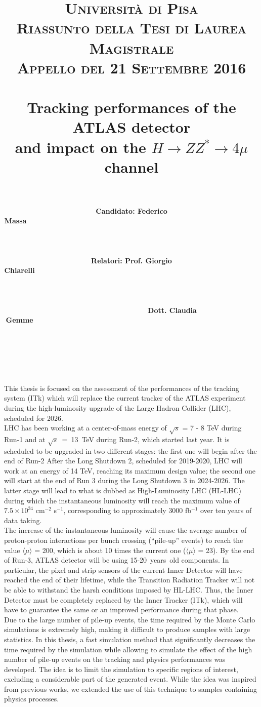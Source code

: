 \documentclass[paper=a4, fontsize=11pt]{scrartcl}	%
\title{
		\usefont{OT1}{bch}{b}{n}
		\normalfont \normalsize \textsc{Universit\`a di Pisa} \\[1ex]
		\normalfont \normalsize \textsc{Riassunto della Tesi di Laurea Magistrale}\\ 
		\normalfont \normalsize \textsc{Appello del 21 Settembre 2016}\\ [25pt]
		\horrule{0.5pt} \\[0.4cm]
		\huge  Tracking performances of the ATLAS detector \\
			and impact on the $H\rightarrow ZZ^{*}\rightarrow 4\mu$ channel\\
		\horrule{2pt} \\[0.0cm]
}
\author{
		\normalfont 								\normalsize
        \textbf{Candidato: Federico Massa\ \ \ \ \ \ \ \ \ \ \ \ \ \ \ \ \ \ \ \ \ \ \ \ \ \ \ \ \ \ \ \ \ \ \ \ \ \ \ \ \ \ \ \ \ \ \ \ \ \ \ \ \ \ \ \ \ \ \ \ \ \ \ \ \ \ \ \ \ \ \ \ \ \ \ \ \ \ \ \ \ \ \ \ \ \ \ \ \ \ \ \ \ \ \ \ \ \ \ \ \ \ \ \ \ \ \ \ \ \ \ \ \ \ \ \ \ \ \ \ \ \ \ \ \ \ \ \ \ \ \ \ \ \ \ \ \ \ \ \ \ \ \ \ \ \ \ \ \ \ \ \ \ \ \ \ \ \ \ \ \ \ \ \ \ \ \ \ \ \ \ \ \ \ \ \ \ \ \ \ \ \ \ \ \ \ \ \ \ \ \ \ \ \ \ \ \ \ \ \ \ \ \ \ \ \ \ \ \ \ \ \ \ \ \ \ \ \ \ \ \ \ \ \ } \\[-3pt]		\normalsize
        \textbf{Relatori: Prof. Giorgio Chiarelli\ \ \ \ \ \ \ \ \ \ \ \ \ \ \ \ \ \ \ \ \ \ \ \ \ \ \ \ \ \ \ \ \ \ \ \ \ \ \ \ \ \ \ \ \ \ \ \ \ \ \ \ \ \ \ \ \ \ \ \ \ \ \ \ \ \ \ \ \ \ \ \ \ \ \ \ \ \ \ \ \ \ \ \ \ \ \ \ \ \ \ \ \ \ \ \ \ \ \ \ \ \ \ \ \ \ \ \ \ \ \ \ \ \ \ \ \ \ \ \ \ \ \ \ \ \ \ \ \ \ \ \ \ \ \ \ \ \ \ \ \ \ \ \ \ \ \ \ \ \ \ \ \ \ \ \ \ \ \ \ \ \ \ \ \ \ \ \ \ \ \ \ \ \ \ \ \ \ \ \ \ \ \ \ \ \ \ \ \ \ \ \ \ \ \ \ \ \ \ \ \ \ \ \ \ \ \ \ \ \ \ \ \ \ } \\ [-3pt]\normalsize
        \textbf{\ \ \ \ \ \ \ \ \ \ \ \ \ \ \ \ \ \ \ \ Dott. Claudia Gemme\ \ \ \ \ \ \ \ \ \ \ \ \ \ \ \ \ \ \ \ \ \ \ \ \ \ \ \ \ \ \ \ \ \ \ \ \ \ \ \ \ \ \ \ \ \ \ \ \ \ \ \ \ \ \ \ \ \ \ \ \ \ \ \ \ \ \ \ \ \ \ \ \ \ \ \ \ \ \ \ \ \ \ \ \ \ \ \ \ \ \ \ \ \ \ \ \ \ \ \ \ \ \ \ \ \ \ \ \ \ \ \ \ \ \ \ \ \ \ \ \ \ \ \ \ \ \ \ \ \ \ \ \ \ \ \ \ \ \ \ \ \ \ \ \ \ \ \ \ \ \ \ \ \ \ \ \ \ \ \ \ \ \ \ \ \ \ \ \ \ \ \ \ \ \ \ \ \ \ \ \ \ \ \ \ \ \ \ \ \ \ \ \ \ \ \ \ \ \ \ \ \ \ \ \ \ \ \ \ \ \ \ \ \ }
}
\date{}
\numberwithin{equation}{section}		%
\numberwithin{figure}{section}			%
\numberwithin{table}{section}				%
\begin{document}
\maketitle

This thesis is focused on the assessment of the performances of the tracking system (ITk) which
will replace the current tracker of the ATLAS experiment during the high-luminosity upgrade of
the Large Hadron Collider (LHC), scheduled for 2026. \\

LHC has been working at a center-of-mass
energy of $\sqrt{s}$ = 7 - 8 TeV during Run-1 and at \mbox{$\sqrt{s}$ = 13 TeV} during Run-2, which started last year. It is scheduled to be upgraded in two different stages: the 
first one will begin after the end of Run-2 After the Long Shutdown 2, scheduled for 2019-2020, LHC will work at
an energy of 14 TeV, reaching its maximum design value; the second one will start at
the end of Run 3 during the Long Shutdown 3 in 2024-2026. The latter stage will lead
to what is dubbed as High-Luminosity LHC (HL-LHC) during which the 
instantaneous luminosity will reach the maximum value of $7.5 \times 10^{34}$ cm$^{-2}$ s${^{-1}}$, corresponding to approximately 3000 fb$^{-1}$ over ten years of data taking. \\

The increase of the instantaneous luminosity will cause the average number of proton-proton interactions per bunch crossing (``pile-up'' events) to reach the value $\langle\mu\rangle$ = 200, which 
is about 10 times the current one ($\langle\mu\rangle$ = 23). By the end of Run-3, ATLAS detector will be using \mbox{15-20 years old} components. In particular, the pixel and strip sensors of the current Inner Detector will have reached the end of their lifetime, while the Transition
Radiation Tracker will not be able to withstand the harsh conditions imposed by HL-LHC. Thus,
 the Inner Detector must be completely replaced by the Inner Tracker (ITk), which will have
 to guarantee the same or an improved performance during that phase.\\

Due to the large number of pile-up events, the time required by the Monte Carlo simulations 
is extremely high, making it difficult to produce samples with large statistics. In this thesis,
a fast simulation method that significantly decreases the time required by the simulation while
allowing to simulate the effect of the high number of pile-up events on the tracking
and physics performances was developed. The idea is to limit the simulation to specific regions of interest, excluding a considerable part of the generated event. While the idea was inspired
from previous works, we extended the use of this technique to samples containing physics 
processes.\\
\end{document}
